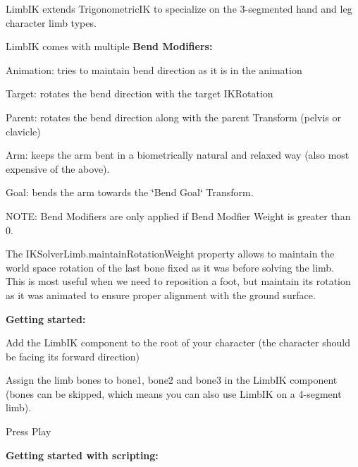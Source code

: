 Limb\+IK extends Trigonometric\+IK to specialize on the 3-\/segmented hand and leg character limb types.

Limb\+IK comes with multiple {\bfseries Bend Modifiers\+:}
\begin{DoxyItemize}
\item Animation\+: tries to maintain bend direction as it is in the animation
\item Target\+: rotates the bend direction with the target I\+K\+Rotation
\item Parent\+: rotates the bend direction along with the parent Transform (pelvis or clavicle)
\item Arm\+: keeps the arm bent in a biometrically natural and relaxed way (also most expensive of the above).
\item Goal\+: bends the arm towards the \char`\"{}\+Bend Goal\char`\"{} Transform.
\end{DoxyItemize}

N\+O\+TE\+: Bend Modifiers are only applied if Bend Modfier Weight is greater than 0.

The I\+K\+Solver\+Limb.\+maintain\+Rotation\+Weight property allows to maintain the world space rotation of the last bone fixed as it was before solving the limb. ~\newline
This is most useful when we need to reposition a foot, but maintain it\textquotesingle{}s rotation as it was animated to ensure proper alignment with the ground surface.

{\bfseries Getting started\+:}
\begin{DoxyItemize}
\item Add the Limb\+IK component to the root of your character (the character should be facing it\textquotesingle{}s forward direction)
\item Assign the limb bones to bone1, bone2 and bone3 in the Limb\+IK component (bones can be skipped, which means you can also use Limb\+IK on a 4-\/segment limb).
\item Press Play
\end{DoxyItemize}

{\bfseries Getting started with scripting\+:}


